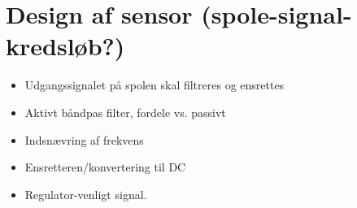 \section{Design af sensor (spole-signal-kredsløb?)}\label{sec:sec_sensor_desgn}
\begin{itemize}
	\item Udgangssignalet på spolen skal filtreres og ensrettes
	\item Aktivt båndpas filter, fordele vs. passivt
	\item Indsnævring af frekvens
	\item Ensretteren/konvertering til DC
	\item Regulator-venligt signal. 
\end{itemize}